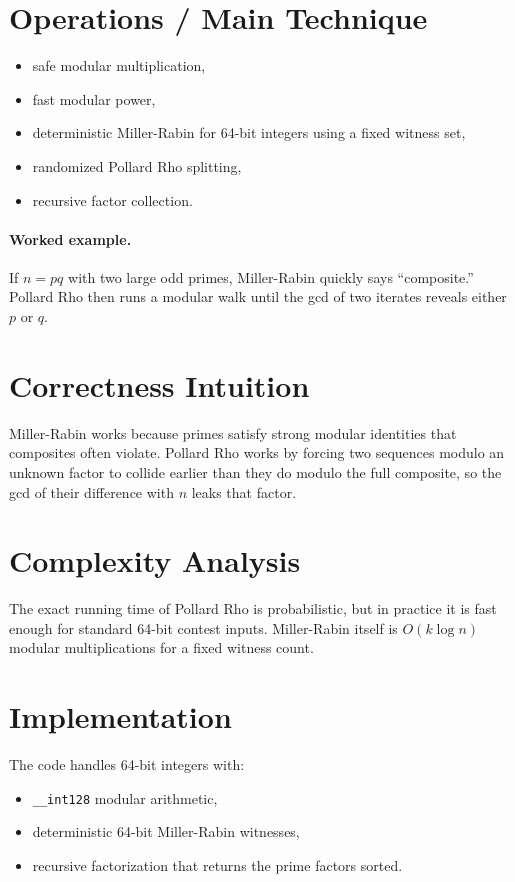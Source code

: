 \section*{Operations / Main Technique}

\begin{itemize}
  \item safe modular multiplication,
  \item fast modular power,
  \item deterministic Miller-Rabin for 64-bit integers using a fixed witness set,
  \item randomized Pollard Rho splitting,
  \item recursive factor collection.
\end{itemize}

\paragraph{Worked example.}
If \(n = pq\) with two large odd primes, Miller-Rabin quickly says ``composite.'' Pollard Rho then runs a modular walk
until the gcd of two iterates reveals either \(p\) or \(q\).

\section*{Correctness Intuition}

Miller-Rabin works because primes satisfy strong modular identities that composites often violate. Pollard Rho works by
forcing two sequences modulo an unknown factor to collide earlier than they do modulo the full composite, so the gcd of
their difference with \(n\) leaks that factor.

\section*{Complexity Analysis}

The exact running time of Pollard Rho is probabilistic, but in practice it is fast enough for standard 64-bit contest
inputs. Miller-Rabin itself is \(O(k \log n)\) modular multiplications for a fixed witness count.

\section*{Implementation}

The code handles 64-bit integers with:

\begin{itemize}
  \item \texttt{\_\_int128} modular arithmetic,
  \item deterministic 64-bit Miller-Rabin witnesses,
  \item recursive factorization that returns the prime factors sorted.
\end{itemize}

